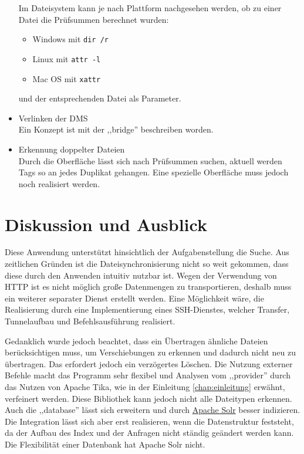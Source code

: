 \documentclass[oneside, ngerman, toc=bibliography,bibliography=totoc,listof=entryprefix, open=right,numbers=noenddot,fontsize=12pt]{scrbook}
\begin{document}
\begin{itemize}
    Im Dateisystem kann je nach Plattform nachgesehen werden, ob zu einer Datei die Prüfsummen berechnet wurden:
    \begin{itemize}
        \item Windows mit \verb|dir /r|
        \item Linux mit \verb|attr -l|
        \item Mac OS mit \verb|xattr|
    \end{itemize}
    
    und der entsprechenden Datei als Parameter.
    
	\item Verlinken der DMS \\
    Ein Konzept ist mit der ,,bridge'' beschreiben worden.
	\item Erkennung doppelter Dateien\\
Durch die Oberfläche lässt sich nach Prüfsummen suchen, aktuell werden Tags so an jedes Duplikat gehangen. Eine spezielle Oberfläche muss jedoch noch realisiert werden.
\end{itemize}



\section{Diskussion und Ausblick}
Diese Anwendung unterstützt hinsichtlich der Aufgabenstellung die Suche.
Aus zeitlichen Gründen ist die Dateisynchronisierung nicht so weit gekommen, dass diese durch den Anwenden intuitiv nutzbar ist. Wegen der Verwendung von HTTP ist es nicht möglich große Datenmengen zu transportieren, deshalb muss ein weiterer separater Dienst erstellt werden. Eine Möglichkeit wäre, die Realisierung durch eine Implementierung eines SSH-Dienstes, welcher Transfer, Tunnelaufbau und Befehlsausführung realisiert. 

Gedanklich wurde jedoch beachtet, dass ein Übertragen ähnliche Dateien berücksichtigen muss, um Verschiebungen zu erkennen und dadurch nicht neu zu übertragen. Das erfordert jedoch ein verzögertes Löschen. Die Nutzung externer Befehle macht das Programm sehr flexibel und Analysen vom ,,provider'' durch das Nutzen von Apache Tika, wie in der Einleitung \ref{chap:einleitung} erwähnt, verfeinert werden. Diese Bibliothek kann jedoch nicht alle Dateitypen erkennen.
Auch die ,,database'' lässt sich erweitern und durch \href{http://lucene.apache.org/solr/}{ Apache Solr}
besser indizieren. Die Integration lässt sich aber erst realisieren, wenn die Datenstruktur feststeht, da der Aufbau des Index und der Anfragen nicht ständig geändert werden kann. Die Flexibilität einer Datenbank hat Apache Solr nicht.
\end{document}
